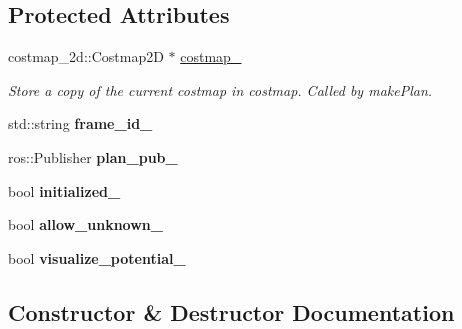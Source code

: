 \subsection*{Protected Attributes}
\begin{DoxyCompactItemize}
\item 
\mbox{\label{classglobal__planner_1_1_global_planner_a790fb19fb46e1a1edc15f98b1075e849}} 
costmap\+\_\+2d\+::\+Costmap2D $\ast$ \mbox{\hyperlink{classglobal__planner_1_1_global_planner_a790fb19fb46e1a1edc15f98b1075e849}{costmap\+\_\+}}
\begin{DoxyCompactList}\small\item\em Store a copy of the current costmap in {\itshape costmap}. Called by make\+Plan. \end{DoxyCompactList}\item 
\mbox{\label{classglobal__planner_1_1_global_planner_a4a8bf49e32dcae69b02adabe35b99ed0}} 
std\+::string {\bfseries frame\+\_\+id\+\_\+}
\item 
\mbox{\label{classglobal__planner_1_1_global_planner_ae90f4043291a203f62ad9259796792dc}} 
ros\+::\+Publisher {\bfseries plan\+\_\+pub\+\_\+}
\item 
\mbox{\label{classglobal__planner_1_1_global_planner_abd54fe2b4a6f92fec92e49da3739e016}} 
bool {\bfseries initialized\+\_\+}
\item 
\mbox{\label{classglobal__planner_1_1_global_planner_adc356fbcaa27c897710becc5f7ad9777}} 
bool {\bfseries allow\+\_\+unknown\+\_\+}
\item 
\mbox{\label{classglobal__planner_1_1_global_planner_a74d3e7b867447cea6d718350fc0b303b}} 
bool {\bfseries visualize\+\_\+potential\+\_\+}
\end{DoxyCompactItemize}


\subsection{Constructor \& Destructor Documentation}
\mbox{\label{classglobal__planner_1_1_global_planner_aaeb34983765b053861cbef08e9614bb5}} 
